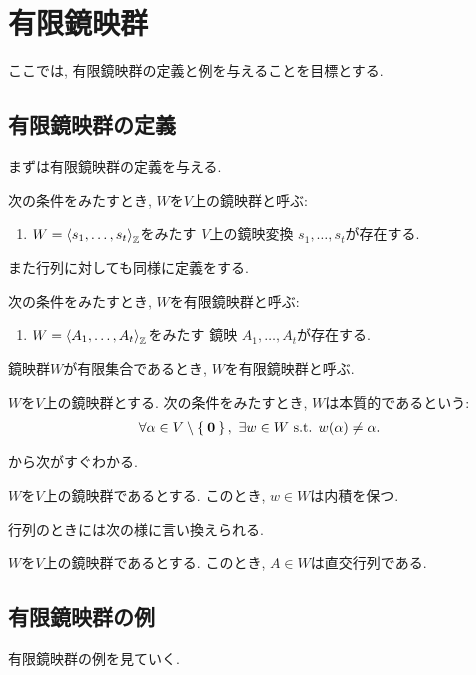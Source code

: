\chapter{有限鏡映群}
ここでは,
有限鏡映群の定義と例を与えることを目標とする.
\section{有限鏡映群の定義}
まずは有限鏡映群の定義を与える.
\begin{definition}
  次の条件をみたすとき, 
  $W$を$V$上の鏡映群と呼ぶ:
  \begin{enumerate}
  \item
    $W=\Braket{s_1,\ldots,s_t}_{\mathbb{Z}}$をみたす
    $V$上の鏡映変換
    $s_1,\ldots,s_t$が存在する.
  \end{enumerate}
\end{definition}

また行列に対しても同様に定義をする.
\begin{definition}
  次の条件をみたすとき, 
  $W$を有限鏡映群と呼ぶ:
  \begin{enumerate}
  \item
    $W=\Braket{A_1,\ldots,A_t}_{\mathbb{Z}}$をみたす
    鏡映
    $A_1,\ldots,A_t$が存在する.
  \end{enumerate}
\end{definition}
鏡映群$W$が有限集合であるとき,
$W$を有限鏡映群と呼ぶ.

\begin{definition}
  $W$を$V$上の鏡映群とする.
  次の条件をみたすとき, 
  $W$は本質的であるという:
  \begin{align*}
    \forall \alpha\in V\setminus\Set{\zzero},\ 
    \exists w\in W
    \text{ s.t. }
    w(\alpha)\neq \alpha.
  \end{align*}
\end{definition}

から次がすぐわかる.
\begin{prop}
\label{prop:reflgrpisortho}
  $W$を$V$上の鏡映群であるとする.
  このとき, $w\in W$は内積を保つ.
\end{prop}

行列のときには次の様に言い換えられる.
\begin{prop}
  $W$を$V$上の鏡映群であるとする.
  このとき, $A \in W$は直交行列である.
\end{prop}

\section{有限鏡映群の例}
有限鏡映群の例を見ていく.
